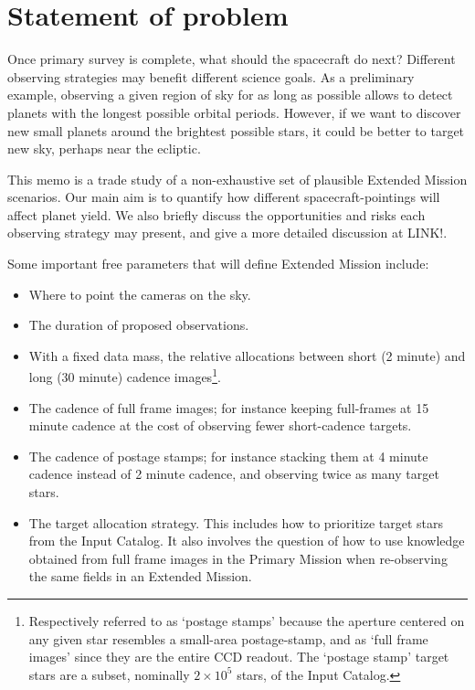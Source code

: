 \section{Statement of problem}
\label{sec:statement_of_problem}

Once \tesss primary survey is complete, what should the spacecraft do next? 
Different observing strategies may benefit different science goals. 
As a preliminary example, observing a given region of sky for as long as possible allows \tess to detect planets with the longest possible orbital periods.
However, if we want to discover new small planets around the brightest possible stars, it could be better to target new sky, perhaps near the ecliptic.


This memo is a trade study of a non-exhaustive set of plausible Extended Mission scenarios. 
Our main aim is to quantify how different spacecraft-pointings will affect \tesss planet yield.
We also briefly discuss the opportunities and risks each observing strategy may present, and give a more detailed discussion at LINK!.

Some important free parameters that will define \tesss Extended Mission include:
\begin{itemize}
	\item Where to point the cameras on the sky.
	\item The duration of proposed observations.
	\item With a fixed data mass, the relative allocations between short (2 minute) and long (30 minute) cadence images\footnote{Respectively referred to as `postage stamps' because the aperture centered on any given star resembles a small-area postage-stamp, and as `full frame images' since they are the entire CCD readout. The `postage stamp' target stars are a subset, nominally $2\times 10^5$ stars, of the \tess Input Catalog.}. 
	\item The cadence of full frame images; for instance keeping full-frames at 15 minute cadence at the cost of observing fewer short-cadence targets.
	\item The cadence of postage stamps; for instance stacking them at 4 minute cadence instead of 2 minute cadence, and observing twice as many target stars.
	\item The target allocation strategy. This includes how to prioritize target stars from the \tess Input Catalog. It also involves the question of how to use knowledge obtained from full frame images in the Primary Mission when re-observing the same fields in an Extended Mission.
\end{itemize}

